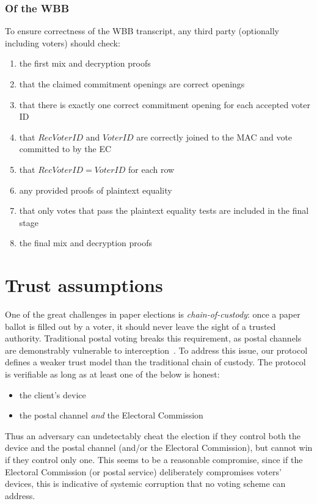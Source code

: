 \documentclass[11pt,twoside,a4paper]{article}
\theoremstyle{definition}
\newcommand{\VoterID}{\mathit{VoterID}}
\newcommand{\receivedvid}{\mathit{RecVoterID}}
\begin{document}
\subsubsection{Of the WBB}
To ensure correctness of the WBB transcript, any third party (optionally including voters) should check:
\begin{enumerate}
	\item the first mix and decryption proofs
	\item that the claimed commitment openings are correct openings
	\item that there is exactly one correct commitment opening for each accepted voter ID
	\item that $\receivedvid$ and $\VoterID$ are correctly joined to the MAC and vote committed to by the EC
	\item that $\receivedvid = \VoterID$ for each row
	\item any provided proofs of plaintext equality
	\item that only votes that pass the plaintext equality tests are included in the final stage
	\item the final mix and decryption proofs
\end{enumerate}
\section{Trust assumptions}
One of the great challenges in paper elections is \textit{chain-of-custody}: once a paper ballot is filled out by a voter, it should never leave the sight of a trusted authority. Traditional postal voting breaks this requirement, as postal channels are demonstrably vulnerable to interception~\cite{stewart2010losing}. To address this issue, our protocol defines a weaker trust model than the traditional chain of custody. The protocol is verifiable as long as at least one of the below is honest:
\begin{itemize}
    \item the client's device
    \item the postal channel \textit{and} the Electoral Commission
\end{itemize}
Thus an adversary can undetectably cheat the election if they control both the device and the postal channel (and/or the Electoral Commission), but cannot win if they control only one. This seems to be a reasonable compromise, since if the Electoral Commission (or postal service) deliberately compromises voters' devices, this is indicative of systemic corruption that no voting scheme can address.
\end{document}
